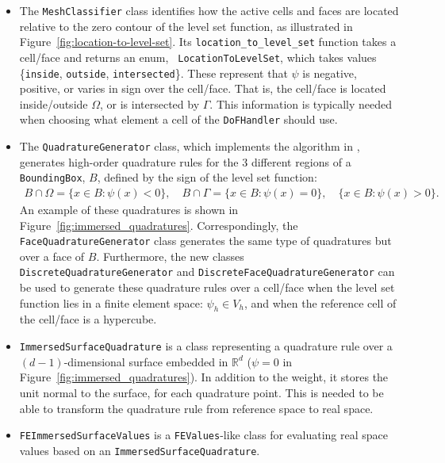 \documentclass{ansarticle-preprint}
\begin{document}
\begin{itemize}
  \item The \texttt{MeshClassifier} class identifies how the active cells and faces are located relative to the zero contour of the level set function, as illustrated in Figure~\ref{fig:location-to-level-set}. Its \texttt{location\_to\_level\_set} function takes a cell/face and
        returns an enum, \texttt{ LocationToLevelSet}, which takes values \{\texttt{inside}, \texttt{outside}, \texttt{intersected}\}.
        These represent that $\psi$ is negative, positive, or varies in sign over the cell/face.
        That is, the cell/face is located inside/outside $\Omega$, or is intersected by $\Gamma$.
        This information is typically needed when choosing what element a cell of the \texttt{DoFHandler} should use.

  \item The \texttt{QuadratureGenerator} class, which implements the algorithm in \cite{saye2015}, generates high-order quadrature rules for the 3 different regions of a \texttt{BoundingBox}, $B$, defined by the sign of the level set function:
        \begin{align}
          B \cap \Omega = \{ x\in B:  \psi(x) < 0 \},  \quad
          B \cap \Gamma = \{ x\in B:  \psi(x) = 0 \},  \quad
          \{ x\in B:  \psi(x) > 0 \}.
        \end{align}
        An example of these quadratures is shown in Figure~\ref{fig:immersed_quadratures}.
        Correspondingly, the \newline \texttt{FaceQuadratureGenerator} class generates the same type of quadratures but over a face of $B$.
        Furthermore, the new classes \texttt{DiscreteQuadratureGenerator} and \newline \texttt{DiscreteFaceQuadratureGenerator} can be used to generate these quadrature rules over a cell/face when the level set function lies in a finite element space: $\psi_h \in V_h$, and when the reference cell of the cell/face is a hypercube.

  \item \texttt{ImmersedSurfaceQuadrature} is a class representing a quadrature rule over a $(d-1)$-dimensional surface embedded in $\mathbb{R}^d$ ($\psi = 0$ in Figure~\ref{fig:immersed_quadratures}). In addition to the weight, it stores the unit normal to the surface, for each quadrature point. This is needed to be able to transform the quadrature rule from reference space to real space.

  \item \texttt{FEImmersedSurfaceValues} is a \texttt{FEValues}-like class for evaluating real space values based on an \texttt{ImmersedSurfaceQuadrature}.


\end{itemize}
\end{document}
